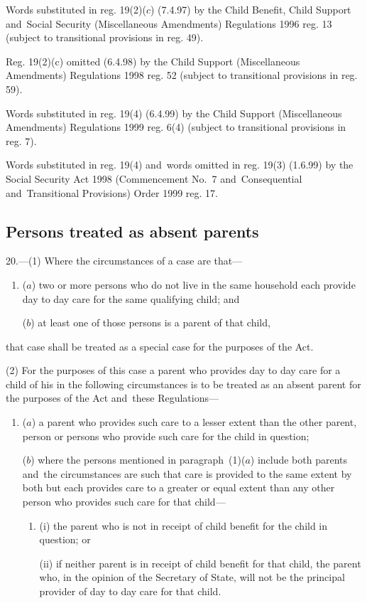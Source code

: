 \documentclass[12pt,a4paper]{article}
\begin{document}
{Words substituted in reg. 19(2)($c$) (7.4.97) by the Child Benefit, Child Support and~Social Security (Miscellaneous Amendments) Regulations 1996 reg. 13 (subject to transitional provisions in reg. 49).

Reg. 19(2)(c) omitted (6.4.98) by the Child Support (Miscellaneous Amendments) Regulations 1998 reg. 52 (subject to transitional provisions in reg. 59).

Words substituted in reg. 19(4) (6.4.99) by the Child Support (Miscellaneous Amendments) Regulations 1999 reg. 6(4) (subject to transitional provisions in reg. 7).

Words substituted in reg. 19(4) and~words omitted in reg. 19(3) (1.6.99) by the Social Security Act 1998 (Commencement No.\ 7 and~Consequential and~Transitional Provisions) Order 1999 reg. 17.
}

\subsection[20. Persons treated as absent parents]{Persons treated as absent parents}

20.—(1) Where the circumstances of a case are that—
\begin{enumerate}\item[]
($a$) two or more persons who do not live in the same household each provide day to day care for the same qualifying child; and

($b$) at least one of those persons is a parent of that child,
\end{enumerate}
that case shall be treated as a special case for the purposes of the Act.

(2) For the purposes of this case a parent who provides day to day care for a child of his in the following circumstances is to be treated as an absent parent for the purposes of the Act and~these Regulations—
\begin{enumerate}\item[]
($a$) a parent who provides such care to a lesser extent than the other parent, person or persons who provide such care for the child in question;

($b$) where the persons mentioned in paragraph~(1)($a$) include both parents and~the circumstances are such that care is provided to the same extent by both but each provides care to a greater or equal extent than any other person who provides such care for that child—
\begin{enumerate}\item[]
(i) the parent who is not in receipt of child benefit for the child in question; or

(ii) if neither parent is in receipt of child benefit for that child, the parent who, in the opinion of the 
Secretary of State,  %
will not be the principal provider of day to day care for that child.
\end{enumerate}
\end{enumerate}
\end{document}
